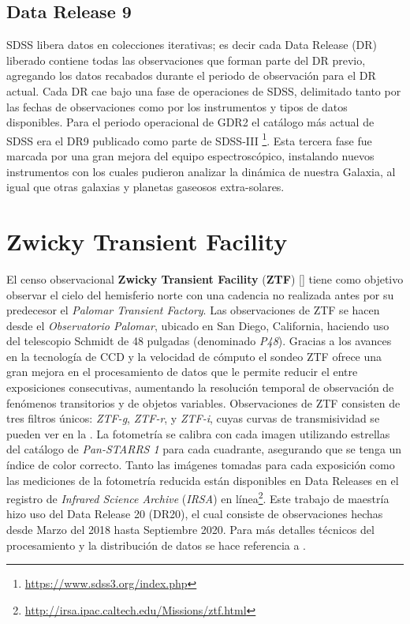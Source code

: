 \subsection{Data Release 9}

SDSS libera datos en colecciones iterativas; es decir cada Data Release (DR)
liberado contiene todas las observaciones que forman parte del DR previo,
agregando los datos recabados durante el periodo de observación para el DR
actual. Cada DR cae bajo una fase de operaciones de SDSS, delimitado tanto por
las fechas de observaciones como por los instrumentos y tipos de datos
disponibles. Para el periodo operacional de GDR2 el catálogo más actual de SDSS 
era el DR9 publicado como parte de SDSS-III
\footnote{\url{https://www.sdss3.org/index.php}}. Esta tercera fase fue marcada
por una gran mejora del equipo espectroscópico, instalando nuevos instrumentos
con los cuales pudieron analizar la dinámica de nuestra Galaxia, al igual que
otras galaxias y planetas gaseosos extra-solares. 

\section{Zwicky Transient Facility}

El censo observacional \textbf{Zwicky Transient Facility} (\textbf{ZTF})
[] tiene como
objetivo observar el cielo del hemisferio norte con una cadencia no realizada
antes por su predecesor el \textit{Palomar Transient Factory}. Las observaciones
de ZTF se hacen desde el \textit{Observatorio Palomar}, ubicado en San Diego,
California, haciendo uso del telescopio Schmidt de 48 pulgadas (denominado
\textit{P48}). Gracias a los avances en la tecnología de CCD y la velocidad de
cómputo el sondeo ZTF ofrece una gran mejora en el procesamiento de datos que le
permite reducir el  entre exposiciones consecutivas,
aumentando la resolución temporal de observación de fenómenos transitorios y de
objetos variables. Observaciones de ZTF consisten de tres filtros únicos: 
\textit{ZTF-g}, \textit{ZTF-r}, y \textit{ZTF-i}, cuyas curvas de
transmisividad se pueden ver en la . La
fotometría se calibra con cada imagen utilizando estrellas del
catálogo de \textit{Pan-STARRS 1} para cada cuadrante, asegurando que se tenga
un índice de color correcto. Tanto las imágenes tomadas para cada exposición
como las mediciones de la fotometría reducida están disponibles en Data Releases
en el registro de \textit{Infrared Science Archive} (\textit{IRSA}) en
línea\footnote{\url{http://irsa.ipac.caltech.edu/Missions/ztf.html}}. Este
trabajo de maestría hizo uso del Data Release 20 (DR20), el cual consiste de
observaciones hechas desde Marzo del 2018 hasta Septiembre 2020. Para más
detalles técnicos del procesamiento y la distribución de datos se hace
referencia a .

